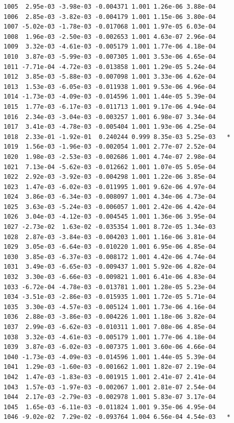 \documentclass[
  letterpaper,
  DIV=11,
  numbers=noendperiod]{scrartcl}
\begin{document}
\begin{verbatim}
1005  2.95e-03 -3.98e-03 -0.004371 1.001 1.26e-06 3.88e-04    
1006  2.85e-03 -3.82e-03 -0.004179 1.001 1.15e-06 3.80e-04    
1007 -5.02e-03 -1.78e-03 -0.017068 1.001 1.97e-05 6.03e-04    
1008  1.96e-03 -2.50e-03 -0.002653 1.001 4.63e-07 2.96e-04    
1009  3.32e-03 -4.61e-03 -0.005179 1.001 1.77e-06 4.18e-04    
1010  3.87e-03 -5.99e-03 -0.007305 1.001 3.53e-06 4.65e-04    
1011 -7.71e-04 -4.72e-03 -0.013858 1.001 1.29e-05 5.24e-04    
1012  3.85e-03 -5.88e-03 -0.007098 1.001 3.33e-06 4.62e-04    
1013  1.53e-03 -6.05e-03 -0.011938 1.001 9.53e-06 4.96e-04    
1014 -1.73e-03 -4.09e-03 -0.014596 1.001 1.44e-05 5.39e-04    
1015  1.77e-03 -6.17e-03 -0.011713 1.001 9.17e-06 4.94e-04    
1016  2.34e-03 -3.04e-03 -0.003257 1.001 6.98e-07 3.34e-04    
1017  3.41e-03 -4.78e-03 -0.005404 1.001 1.93e-06 4.25e-04    
1018  2.33e-01 -1.92e-01  0.240244 0.999 8.35e-03 5.25e-03   *
1019  1.56e-03 -1.96e-03 -0.002054 1.001 2.77e-07 2.52e-04    
1020  1.98e-03 -2.53e-03 -0.002686 1.001 4.74e-07 2.98e-04    
1021  7.13e-04 -5.62e-03 -0.012662 1.001 1.07e-05 5.05e-04    
1022  2.92e-03 -3.92e-03 -0.004298 1.001 1.22e-06 3.85e-04    
1023  1.47e-03 -6.02e-03 -0.011995 1.001 9.62e-06 4.97e-04    
1024  3.86e-03 -6.34e-03 -0.008097 1.001 4.34e-06 4.73e-04    
1025  3.63e-03 -5.24e-03 -0.006057 1.001 2.42e-06 4.42e-04    
1026  3.04e-03 -4.12e-03 -0.004545 1.001 1.36e-06 3.95e-04    
1027 -2.73e-02  1.63e-02 -0.035354 1.001 8.72e-05 1.34e-03    
1028  2.87e-03 -3.84e-03 -0.004203 1.001 1.16e-06 3.81e-04    
1029  3.05e-03 -6.64e-03 -0.010220 1.001 6.95e-06 4.85e-04    
1030  3.85e-03 -6.37e-03 -0.008172 1.001 4.42e-06 4.74e-04    
1031  3.49e-03 -6.65e-03 -0.009437 1.001 5.92e-06 4.82e-04    
1032  3.30e-03 -6.66e-03 -0.009821 1.001 6.41e-06 4.83e-04    
1033 -6.72e-04 -4.78e-03 -0.013781 1.001 1.28e-05 5.23e-04    
1034 -3.51e-03 -2.86e-03 -0.015935 1.001 1.72e-05 5.71e-04    
1035  3.30e-03 -4.57e-03 -0.005124 1.001 1.73e-06 4.16e-04    
1036  2.88e-03 -3.86e-03 -0.004226 1.001 1.18e-06 3.82e-04    
1037  2.99e-03 -6.62e-03 -0.010311 1.001 7.08e-06 4.85e-04    
1038  3.32e-03 -4.61e-03 -0.005179 1.001 1.77e-06 4.18e-04    
1039  3.87e-03 -6.02e-03 -0.007375 1.001 3.60e-06 4.66e-04    
1040 -1.73e-03 -4.09e-03 -0.014596 1.001 1.44e-05 5.39e-04    
1041  1.29e-03 -1.60e-03 -0.001662 1.001 1.82e-07 2.19e-04    
1042  1.47e-03 -1.83e-03 -0.001915 1.001 2.41e-07 2.41e-04    
1043  1.57e-03 -1.97e-03 -0.002067 1.001 2.81e-07 2.54e-04    
1044  2.17e-03 -2.79e-03 -0.002978 1.001 5.83e-07 3.17e-04    
1045  1.65e-03 -6.11e-03 -0.011824 1.001 9.35e-06 4.95e-04    
1046 -9.02e-02  7.29e-02 -0.093764 1.004 6.56e-04 4.54e-03   *

\end{verbatim}
\end{document}
